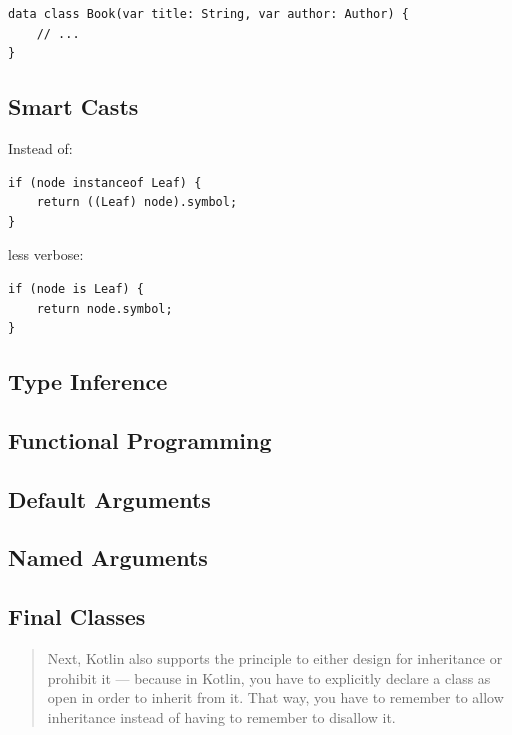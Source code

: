 \documentclass[11pt, a4paper]{report}
\begin{document}
\begin{lstlisting}
data class Book(var title: String, var author: Author) {
    // ...
}
\end{lstlisting}

\subsection{Smart Casts}

Instead of:

\begin{lstlisting}
if (node instanceof Leaf) {
    return ((Leaf) node).symbol;
}
\end{lstlisting}

less verbose:

\begin{lstlisting}
if (node is Leaf) {
    return node.symbol;
}
\end{lstlisting}

\subsection{Type Inference}

\subsection{Functional Programming}

\subsection{Default Arguments}

\subsection{Named Arguments}

\subsection{Final Classes}

\begin{quotation}
Next, Kotlin also supports the principle to either design for inheritance or prohibit it — because in Kotlin, you have to explicitly declare a class as open in order to inherit from it. That way, you have to remember to allow inheritance instead of having to remember to disallow it.\cite{kotlin-sommerhoff}
\end{quotation}
\end{document}
